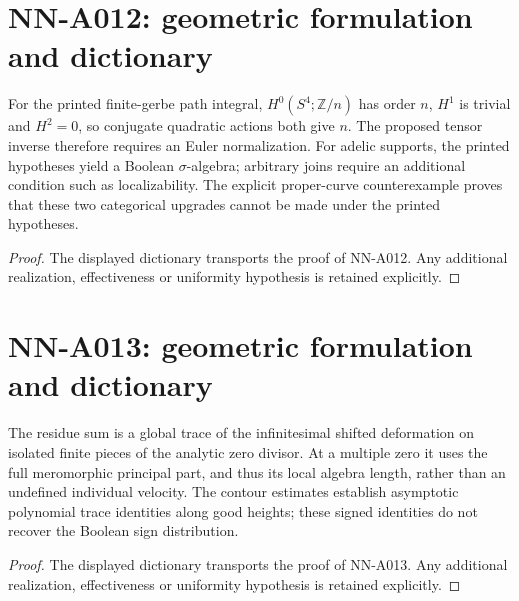 \section{NN-A012: geometric formulation and dictionary}
\begin{geometricstatement}[NN-A012]
For the printed finite-gerbe path integral, $H^0(S^4;\mathbb Z/n)$ has order $n$, $H^1$ is trivial and $H^2=0$, so conjugate quadratic actions both give $n$. The proposed tensor inverse therefore requires an Euler normalization. For adelic supports, the printed hypotheses yield a Boolean $\sigma$-algebra; arbitrary joins require an additional condition such as localizability. The explicit proper-curve counterexample proves that these two categorical upgrades cannot be made under the printed hypotheses.
\end{geometricstatement}
\begin{proof} The displayed dictionary transports the proof of NN-A012. Any additional realization, effectiveness or uniformity hypothesis is retained explicitly.\end{proof}


\section{NN-A013: geometric formulation and dictionary}
\begin{geometricstatement}[NN-A013]
The residue sum is a global trace of the infinitesimal shifted deformation on isolated finite pieces of the analytic zero divisor. At a multiple zero it uses the full meromorphic principal part, and thus its local algebra length, rather than an undefined individual velocity. The contour estimates establish asymptotic polynomial trace identities along good heights; these signed identities do not recover the Boolean sign distribution.
\end{geometricstatement}
\begin{proof} The displayed dictionary transports the proof of NN-A013. Any additional realization, effectiveness or uniformity hypothesis is retained explicitly.\end{proof}


